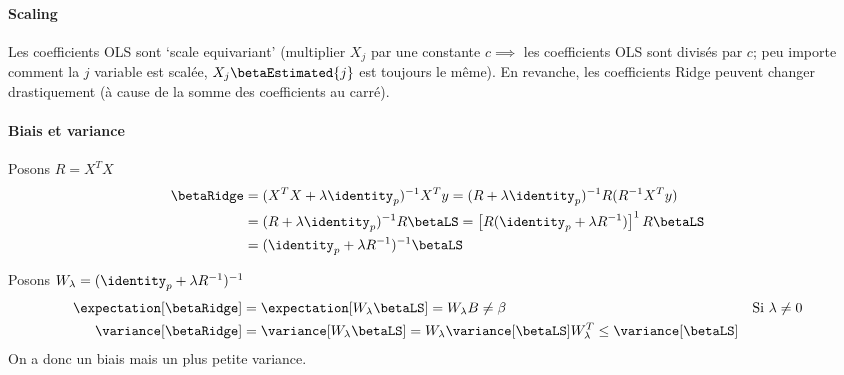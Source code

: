             \paragraph{Scaling}
                Les coefficients OLS sont `scale equivariant' (multiplier \(X_j\) par une constante \(c \implies\) les coefficients OLS sont divisés par \(c\); peu importe comment la \(j\)\ieme{} variable est scalée, \(X_j\betaEstimated{j}\) est toujours le même). En revanche, les coefficients Ridge peuvent changer drastiquement (à cause de la somme des coefficients au carré).

            \paragraph{Biais et variance}
                Posons \(R = X^T X\)
                \begin{align*}
                    \betaRidge &= (X^T X + \lambda \identity_p)^{-1} X^T y = (R + \lambda \identity_p)^{-1} R(R^{-1} X^T y)\\
                    &= (R + \lambda \identity_p)^{-1} R \betaLS = \left[R(\identity_p + \lambda R^{-1})\right]^1 R \betaLS\\
                    &= (\identity_p + \lambda R^{-1})^{-1} \betaLS
                \end{align*}
                
                Posons \(W_\lambda = (\identity_p + \lambda R^{-1})^{-1}\)
                \begin{align*}
                    \expectation[\betaRidge] &= \expectation[W_\lambda \betaLS] = W_\lambda B \not= \beta & \text{Si \(\lambda \not= 0\)}\\
                    \variance[\betaRidge] &= \variance[W_\lambda \betaLS] = W_\lambda \variance[\betaLS] W_\lambda^T \leq \variance[\betaLS]
                \end{align*}
                On a donc un biais mais un plus petite variance.

